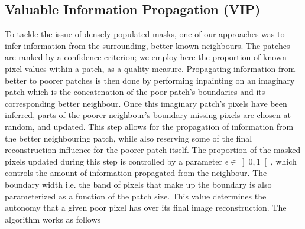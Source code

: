 \subsection{Valuable Information Propagation (VIP)}
To tackle the issue of densely populated masks, one of our approaches was to infer information from the surrounding, better known neighbours. The patches are ranked by a confidence criterion; we employ here the proportion of known pixel values within a patch, as a quality measure. Propagating information from better to poorer patches is then done by performing inpainting on an imaginary patch which is the concatenation of the poor patch's boundaries and its corresponding better neighbour. Once this imaginary patch's pixels have been inferred, parts of the poorer neighbour's boundary missing pixels are chosen at random, and updated. This step allows for the propagation of information from the better neighbouring patch, while also reserving some of the final reconstruction influence for the poorer patch itself. The proportion of the masked pixels updated during this step is controlled by a parameter $\epsilon \in \left] 0,1 \right[$, which controls the amount of information propagated from the neighbour. The boundary width i.e. the band of pixels that make up the boundary is also parameterized as a function of the patch size. This value determines the autonomy that a given poor pixel has over its final image reconstruction. The algorithm works as follows

%   
%
%	
%    

